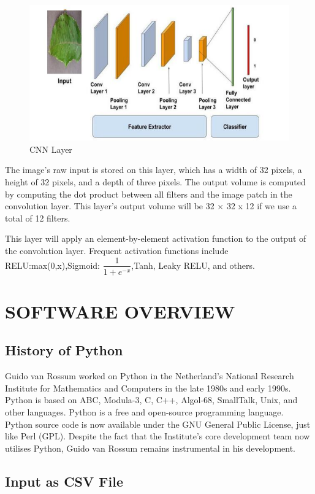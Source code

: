 \begin{figure}[]
\includegraphics{Capture}
\caption{CNN Layer}
\end{figure}

The image's raw input is stored on this layer, which has a width of 32 pixels, a height of 32 pixels, and a depth of three pixels.
The output volume is computed by computing the dot product between all filters and the image patch in the convolution layer. This layer's output volume will be 32 × 32 x 12 if we use a total of 12 filters.

This layer will apply an element-by-element activation function to the output of the convolution layer. Frequent activation functions include RELU:max(0,x),Sigmoid: $\dfrac{1}{1+e^{-x}}$,Tanh, Leaky RELU, and others.

\section{SOFTWARE OVERVIEW}

\subsection{History of Python}

Guido van Rossum worked on Python in the Netherland's National Research
Institute for Mathematics and Computers in the late 1980s and early 1990s. Python
is based on ABC, Modula-3, C, C++, Algol-68, SmallTalk, Unix, and other
languages.
Python is a free and open-source programming language. Python source code is
now available under the GNU General Public License, just like Perl (GPL).
Despite the fact that the Institute's core development team now utilises Python,
Guido van Rossum remains instrumental in his development.

\subsection{Input as CSV File}


